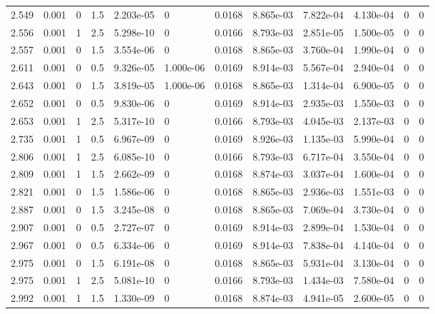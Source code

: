\documentclass[preview]{standalone}
\begin{document}
{{{\begin{tabular}{L{1.2cm}C{1.2cm} C{0.3cm}C{0.5cm} C{1.4cm}C{1.4cm} C{1.4cm}C{1.4cm} C{1.6cm}C{1.6cm} C{1.6cm}C{1.6cm}}
  2.549  &  0.001  & 0     & 1.5 &  2.203e-05  & 0  &  0.0168&   8.865e-03& 7.822e-04 & 4.130e-04   &  0 & 0  \\ 
  2.556  &  0.001  & 1     & 2.5 &  5.298e-10  & 0  &  0.0166&   8.793e-03& 2.851e-05 & 1.500e-05   &  0 & 0  \\ 
  2.557  &  0.001  & 0     & 1.5 &  3.554e-06  & 0  &  0.0168&   8.865e-03& 3.760e-04 & 1.990e-04   &  0 & 0  \\ 
  2.611  &  0.001  & 0     & 0.5 &  9.326e-05  & 1.000e-06  &  0.0169&   8.914e-03& 5.567e-04 & 2.940e-04   &  0 & 0  \\ 
  2.643  &  0.001  & 0     & 1.5 &  3.819e-05  & 1.000e-06  &  0.0168&   8.865e-03& 1.314e-04 & 6.900e-05   &  0 & 0  \\ 
  2.652  &  0.001  & 0     & 0.5 &  9.830e-06  & 0  &  0.0169&   8.914e-03& 2.935e-03 & 1.550e-03   &  0 & 0  \\ 
  2.653  &  0.001  & 1     & 2.5 &  5.317e-10  & 0  &  0.0166&   8.793e-03& 4.045e-03 & 2.137e-03   &  0 & 0  \\ 
  2.735  &  0.001  & 1     & 0.5 &  6.967e-09  & 0  &  0.0169&   8.926e-03& 1.135e-03 & 5.990e-04   &  0 & 0  \\ 
  2.806  &  0.001  & 1     & 2.5 &  6.085e-10  & 0  &  0.0166&   8.793e-03& 6.717e-04 & 3.550e-04   &  0 & 0  \\ 
  2.809  &  0.001  & 1     & 1.5 &  2.662e-09  & 0  &  0.0168&   8.874e-03& 3.037e-04 & 1.600e-04   &  0 & 0  \\ 
  2.821  &  0.001  & 0     & 1.5 &  1.586e-06  & 0  &  0.0168&   8.865e-03& 2.936e-03 & 1.551e-03   &  0 & 0  \\ 
  2.887  &  0.001  & 0     & 1.5 &  3.245e-08  & 0  &  0.0168&   8.865e-03& 7.069e-04 & 3.730e-04   &  0 & 0  \\ 
  2.907  &  0.001  & 0     & 0.5 &  2.727e-07  & 0  &  0.0169&   8.914e-03& 2.899e-04 & 1.530e-04   &  0 & 0  \\ 
  2.967  &  0.001  & 0     & 0.5 &  6.334e-06  & 0  &  0.0169&   8.914e-03& 7.838e-04 & 4.140e-04   &  0 & 0  \\ 
  2.975  &  0.001  & 0     & 1.5 &  6.191e-08  & 0  &  0.0168&   8.865e-03& 5.931e-04 & 3.130e-04   &  0 & 0  \\ 
  2.975  &  0.001  & 1     & 2.5 &  5.081e-10  & 0  &  0.0166&   8.793e-03& 1.434e-03 & 7.580e-04   &  0 & 0  \\ 
  2.992  &  0.001  & 1     & 1.5 &  1.330e-09  & 0  &  0.0168&   8.874e-03& 4.941e-05 & 2.600e-05   &  0 & 0  \\ 

\end{tabular}}}}
\end{document}
